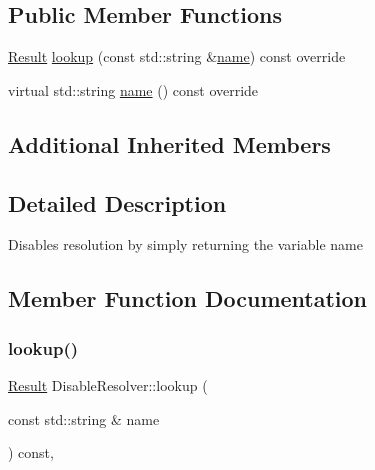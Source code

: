 \subsection*{Public Member Functions}
\begin{DoxyCompactItemize}
\item 
\hyperlink{classtheoria_1_1config_1_1ConfigVariableResolver_af27a85262d802c9ad4ecb1179efaf447}{Result} \hyperlink{classtheoria_1_1config_1_1DisableResolver_ae366903d552dd3a34a380e4918525cd1}{lookup} (const std\+::string \&\hyperlink{classtheoria_1_1config_1_1DisableResolver_ae7caa7a59ad2921ec2cba0544ed26ad0}{name}) const override
\item 
virtual std\+::string \hyperlink{classtheoria_1_1config_1_1DisableResolver_ae7caa7a59ad2921ec2cba0544ed26ad0}{name} () const override
\end{DoxyCompactItemize}
\subsection*{Additional Inherited Members}


\subsection{Detailed Description}
Disables resolution by simply returning the variable name 

\subsection{Member Function Documentation}
\mbox{\label{classtheoria_1_1config_1_1DisableResolver_ae366903d552dd3a34a380e4918525cd1}} 
\subsubsection{\texorpdfstring{lookup()}{lookup()}}
{\footnotesize\ttfamily \hyperlink{classtheoria_1_1config_1_1ConfigVariableResolver_af27a85262d802c9ad4ecb1179efaf447}{Result} Disable\+Resolver\+::lookup (\begin{DoxyParamCaption}\item[{const std\+::string \&}]{name }\end{DoxyParamCaption}) const\hspace{0.3cm}{\ttfamily [override]}, {\ttfamily [virtual]}}

